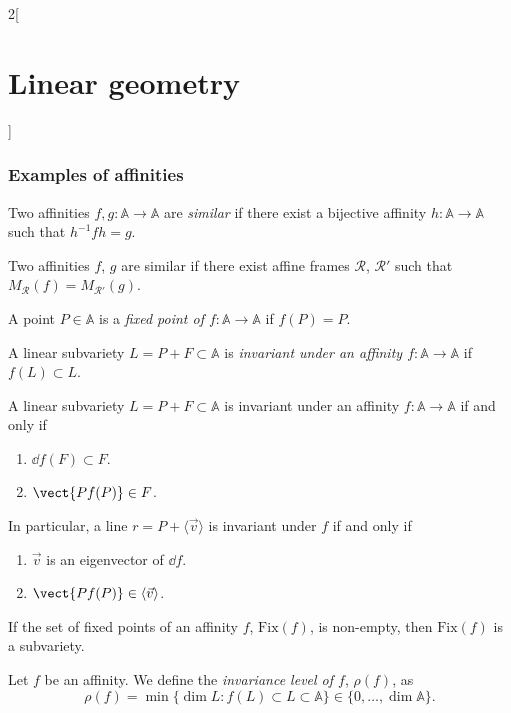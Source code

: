 \documentclass[../../../main.tex]{subfiles}
\begin{document}
\begin{multicols}{2}[\section{Linear geometry}]
\subsubsection*{Examples of affinities}
\begin{definition}
Two affinities $f,g:\mathbb{A}\rightarrow\mathbb{A}$ are \textit{similar} if there exist a bijective affinity $h:\mathbb{A}\rightarrow\mathbb{A}$ such that $h^{-1}fh=g$.
\end{definition}
\begin{prop}
Two affinities $f$, $g$ are similar if there exist affine frames $\mathcal{R}$, $\mathcal{R}'$ such that $M_\mathcal{R}(f)=M_{\mathcal{R}'}(g)$.
\end{prop}
\begin{definition}
A point $P\in\mathbb{A}$ is a \textit{fixed point of $f:\mathbb{A}\rightarrow\mathbb{A}$} if $f(P)=P$.
\end{definition}
\begin{definition}
A linear subvariety $L=P+F\subset\mathbb{A}$ is \textit{invariant under an affinity $f:\mathbb{A}\rightarrow\mathbb{A}$} if $f(L)\subset L$.
\end{definition}
\begin{prop}
A linear subvariety $L=P+F\subset\mathbb{A}$ is invariant under an affinity $f:\mathbb{A}\rightarrow\mathbb{A}$ if and only if
\begin{enumerate}
    \item $\dd f(F)\subset F$.
    \item $\vect{Pf(P)}\in F$.
\end{enumerate} In particular, a line $r=P+\langle\vec{v}\rangle$ is invariant under $f$ if and only if
\begin{enumerate}
    \item $\vec{v}$ is an eigenvector of $\dd f$.
    \item $\vect{Pf(P)}\in\langle\vec{v}\rangle$.
\end{enumerate}
\end{prop}
\begin{prop}
If the set of fixed points of an affinity $f$, $\text{Fix}(f)$, is non-empty, then $\text{Fix}(f)$ is a subvariety.
\end{prop}
\begin{definition}
Let $f$ be an affinity. We define the \textit{invariance level of $f$}, $\rho(f)$, as $$\rho(f)=\min\{\dim L:f(L)\subset L\subset\mathbb{A}\}\in\{0,\ldots,\dim\mathbb{A}\}.$$  
\end{definition}
\begin{definition}[Translations]

\end{definition}
\end{multicols}
\end{document}
